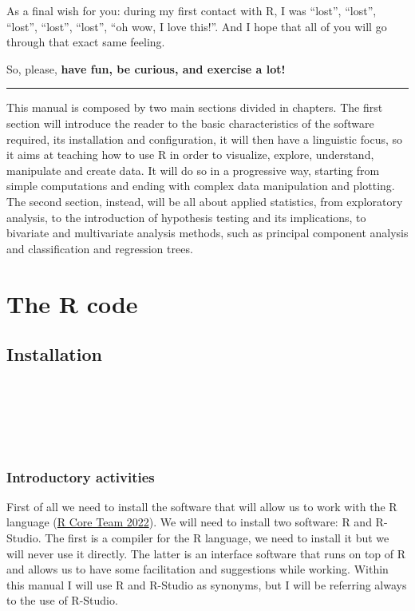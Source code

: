 \documentclass[
]{svmono}
\begin{document}
As a final wish for you: during my first contact with R, I was ``lost'',
``lost'', ``lost'', ``lost'', ``lost'', ``oh wow, I love this!''. And I hope that
all of you will go through that exact same feeling.

So, please, \textbf{have fun, be curious, and exercise a lot!}

\begin{center}\rule{0.5\linewidth}{0.5pt}\end{center}

This manual is composed by two main sections divided in chapters. The
first section will introduce the reader to the basic characteristics of
the software required, its installation and configuration, it will then
have a linguistic focus, so it aims at teaching how to use R in order to
visualize, explore, understand, manipulate and create data. It will do
so in a progressive way, starting from simple computations and ending
with complex data manipulation and plotting. The second section,
instead, will be all about applied statistics, from exploratory
analysis, to the introduction of hypothesis testing and its
implications, to bivariate and multivariate analysis methods, such as
principal component analysis and classification and regression trees.

\hypertarget{part-the-r-code}{%
\part{The R code}\label{part-the-r-code}}

\hypertarget{installation}{%
\chapter{Installation}\label{installation}}

~

~

~

\hypertarget{introductory-activities}{%
\section{Introductory activities}\label{introductory-activities}}

First of all we need to install the software that will allow us to work
with the R language (\protect\hyperlink{ref-rcoreteam2022}{R Core Team 2022}). We will need to install two
software: R and R-Studio. The first is a compiler for the R language, we
need to install it but we will never use it directly. The latter is an
interface software that runs on top of R and allows us to have some
facilitation and suggestions while working. Within this manual I will
use R and R-Studio as synonyms, but I will be referring always to the
use of R-Studio.
\end{document}
